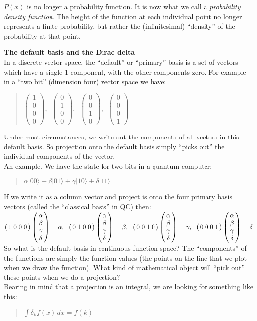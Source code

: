 \documentclass{article}
\def\ket#1{|#1\rangle}
\newcommand{\cviiii}[4]
    {\left(\begin{array}{c}#1\\#2\\#3\\#4\end{array}\right)}
\newcommand{\rviiii}[4]
    {\left(\begin{array}{cccc}#1&#2&#3&#4\end{array}\right)}
\newcommand{\head}[1]{ \vspace{12pt} {\bf #1} \vspace{-12pt}\\ }
\def\p{ \vspace{10pt}\\ }
\begin{document}
$P(x)$ is no longer a probability function. It is now what we call
a {\it probability density function}. The height of the function at each
individual point
no longer represents a finite probability, but rather the (infinitesimal)
``density'' of the probability at that point.

\pagebreak

\head{The default basis and the Dirac delta}

In a discrete vector space, the ``default'' or ``primary'' basis is a
set of vectors which have a single $1$ component, with the other
components zero. For example in a ``two bit'' (dimension four)
vector space we have:

\vspace{6pt}
\begin{quote} 
$\cviiii{1}{0}{0}{0}, \;\; \cviiii{0}{1}{0}{0}, \;\;
\cviiii{0}{0}{1}{0}, \;\; \cviiii{0}{0}{0}{1}$
\end{quote} 
\vspace{6pt}

Under most circumstances, we write out the components of all vectors in
this default basis. So 
projection onto the default basis simply ``picks out'' the individual
components of the vector.
\p
An example. We have the state for two bits in a quantum computer:

\begin{quote}
    $\alpha \ket{00} + \beta\ket{01} + \gamma\ket{10} + \delta\ket{11}$
\end{quote}

If we write it as a column vector and project is onto the four primary
basis vectors (called the ``classical basis'' in QC) then:
\p
$
\arraycolsep=1.4pt %
\rviiii{1}{0}{0}{0} \cviiii{\alpha}{\beta}{\gamma}{\delta} = \alpha,\;\;
\rviiii{0}{1}{0}{0} \cviiii{\alpha}{\beta}{\gamma}{\delta} = \beta,\;\;
\rviiii{0}{0}{1}{0} \cviiii{\alpha}{\beta}{\gamma}{\delta} = \gamma,\;\;
\rviiii{0}{0}{0}{1} \cviiii{\alpha}{\beta}{\gamma}{\delta} = \delta
$
\p
So what is the default basis in continuous function space? The ``components''
of the functions are simply the function values (the points on the
line that we plot when we draw the function). What kind of mathematical
object will ``pick out'' these points when we do a projection?
\p
Bearing in mind that a projection is an integral, we are looking for
something like this:

\begin{quote}
    $\int \delta_k f(x)\, dx = f(k)$
\end{quote}
\end{document}
